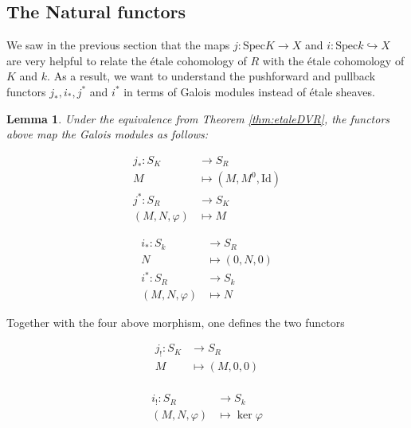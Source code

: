 \documentclass{article}
\newcommand{\Spec}{\mathrm{Spec}}
\newcommand{\Id}{\mathrm{Id}}
\theoremstyle{plain}
\newtheorem{lemma}[theorem]{Lemma}
\theoremstyle{definition}
\begin{document}
    \subsection{The Natural functors}\label{sec:naturalfunc}
    We saw in the previous section that the maps $j:\Spec K\to X$ and $i:\Spec k\hookrightarrow X$ are very helpful to relate the \'{e}tale cohomology of $R$ with the \'{e}tale cohomology of $K$ and $k$. As a result, we want to understand the pushforward and pullback functors $j_*,i_*,j^*$ and $i^*$ in terms of Galois modules instead of \'{e}tale sheaves. 
    \begin{lemma}
        Under the equivalence from Theorem \ref{thm:etaleDVR}, the functors above map the Galois modules as follows:

        \begin{minipage}{0.35\textwidth}
            \begin{align*}
                j_*:S_K&\longrightarrow S_R\\
                M&\longmapsto(M,M^0,\Id)\\
                j^*:S_R&\longrightarrow S_K\\
                (M,N,\varphi)&\longmapsto M
            \end{align*}
        \end{minipage}
        \begin{minipage}{0.35\textwidth}
            \begin{align*}
                i_*:S_k&\longrightarrow S_R\\
                N&\longmapsto(0,N,0)\\
                i^*:S_R&\longrightarrow S_k\\
                (M,N,\varphi)&\longmapsto N
            \end{align*}
        \end{minipage} 
    \end{lemma}

    Together with the four above morphism, one defines the two functors 

    \begin{minipage}{0.35\textwidth}
        \begin{align*}
            j_!:S_K&\longrightarrow S_R\\
            M&\longmapsto(M,0,0)\\
        \end{align*}
    \end{minipage}
    \begin{minipage}{0.35\textwidth}
        \begin{align*}
            i_!:S_R&\longrightarrow S_k\\
            (M,N,\varphi)&\longmapsto\ker\varphi\\
        \end{align*}
    \end{minipage} 
\end{document}
